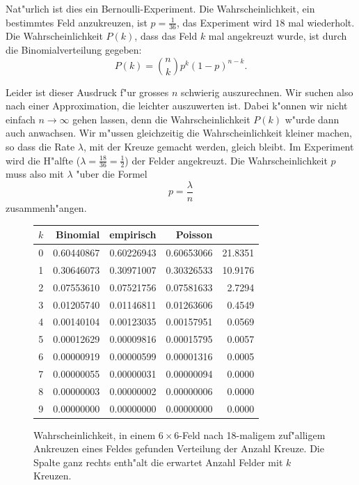 Nat"urlich ist dies ein Bernoulli-Experiment.
Die Wahrscheinlichkeit, ein
bestimmtes Feld anzukreuzen, ist $p=\frac{1}{36}$, das Experiment
wird $18$ mal wiederholt.
Die Wahrscheinlichkeit $P(k)$, dass das Feld $k$ mal
angekreuzt wurde, ist durch die Binomialverteilung gegeben:
\[
P(k)=\binom{n}{k}p^k(1-p)^{n-k}.
\]

Leider ist dieser Ausdruck f"ur grosses $n$ schwierig auszurechnen.
Wir suchen also nach einer Approximation, die leichter auszuwerten ist.
Dabei k"onnen wir nicht einfach $n\to\infty$ gehen lassen, denn die
Wahrscheinlichkeit $P(k)$ w"urde dann auch anwachsen.
Wir m"ussen
gleichzeitig die Wahrscheinlichkeit kleiner machen, so dass die Rate $\lambda$,
mit der Kreuze gemacht werden, gleich bleibt.
Im Experiment wird
die H"alfte ($\lambda=\frac{18}{36}=\frac12$) der Felder angekreuzt.
Die Wahrscheinlichkeit $p$ muss also mit $\lambda$ "uber die Formel
\[
p=\frac{\lambda}{n}
\]
zusammenh"angen.

\begin{figure}
\begin{center}
\begin{tabular}{|r|r|r|r|r|}
\hline
$k$&Binomial&empirisch&Poisson&\\
\hline
0&   0.60440867 & 0.60226943 & 0.60653066 & 21.8351 \\
1&   0.30646073 & 0.30971007 & 0.30326533 & 10.9176 \\
2&   0.07553610 & 0.07521756 & 0.07581633 &  2.7294 \\
3&   0.01205740 & 0.01146811 & 0.01263606 &  0.4549 \\
4&   0.00140104 & 0.00123035 & 0.00157951 &  0.0569 \\
5&   0.00012629 & 0.00009816 & 0.00015795 &  0.0057 \\
6&   0.00000919 & 0.00000599 & 0.00001316 &  0.0005 \\
7&   0.00000055 & 0.00000031 & 0.00000094 &  0.0000 \\
8&   0.00000003 & 0.00000002 & 0.00000006 &  0.0000 \\
9&   0.00000000 & 0.00000000 & 0.00000000 &  0.0000 \\
\hline
\end{tabular}
\end{center}
\caption{Wahrscheinlichkeit, in einem $6\times 6$-Feld nach 18-maligem
zuf"alligem Ankreuzen eines Feldes gefunden Verteilung der Anzahl Kreuze.
Die Spalte ganz rechts enth"alt die erwartet Anzahl Felder mit $k$ Kreuzen.
\label{cross36}}
\end{figure}

